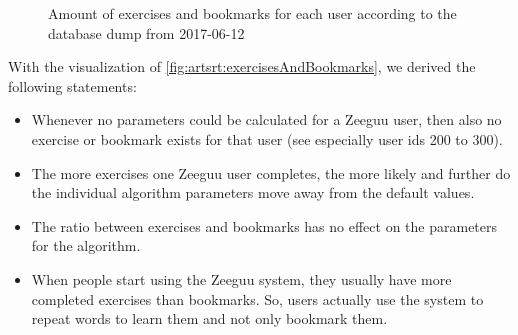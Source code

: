 \documentclass{article}
\begin{document}
\pgfplotsset{compat=1.3} %
\begin{figure}[H]
\caption{Amount of exercises and bookmarks for each user according to the database dump from 2017-06-12}
\label{fig:artsrt:exercisesAndBookmarks}
\end{figure}

With the visualization of \autoref{fig:artsrt:exercisesAndBookmarks}, we derived the following statements:
\begin{itemize}
    \item Whenever no parameters could be calculated for a Zeeguu user, then also no exercise or bookmark exists for that user (see especially user ids 200 to 300).
    
    \item The more exercises one Zeeguu user completes, the more likely and further do the individual algorithm parameters move away from the default values. 
    
    \item The ratio between exercises and bookmarks has no effect on the parameters for the algorithm.
    
    \item When people start using the Zeeguu system, they usually have more completed exercises than bookmarks. So, users actually use the system to repeat words to learn them and not only bookmark them.
\end{itemize}
\end{document}
